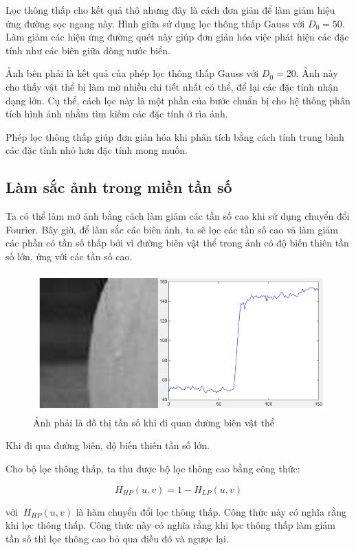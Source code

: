 \documentclass[12pt,a4paper]{report}
\numberwithin{equation}{section}
\theoremstyle{definition} %
\begin{document}
Lọc thông thấp cho kết quả thô nhưng đây là cách đơn giản để làm giảm hiệu ứng đường sọc ngang này. Hình giữa sử dụng lọc thông thấp Gauss với $D_0=50$. Làm giảm các hiệu ứng đường quét này giúp đơn giản hóa việc phát hiện các đặc tính như các biên giữa dòng nước biển.

Ảnh bên phải là kết quả của phép lọc thông thấp Gauss với $D_0=20$. Ảnh này cho thấy vật thể bị làm mờ nhiều chi tiết nhất có thể, để lại các đặc tính nhận dạng lớn. Cụ thể, cách lọc này là một phần của bước chuẩn bị cho hệ thống phân tích hình ảnh nhằm tìm kiếm các đặc tính ở rìa ảnh.

Phép lọc thông thấp giúp đơn giản hóa khi phân tích bằng cách tính trung bình các đặc tính nhỏ hơn đặc tính mong muốn.
\subsection{Làm sắc ảnh trong miền tần số}

Ta có thể làm mở ảnh bằng cách làm giảm các tần số cao khi sử dụng chuyển đổi Fourier. Bây giờ, để làm sắc các biên ảnh, ta sẽ lọc các tần số cao và làm giảm các phần có tần số thấp bởi vì đường biên vật thể trong ảnh có độ biến thiên tần số lớn, ứng với các tần số cao.

\begin{figure}[H]
\centering
\includegraphics[width=0.88\linewidth]{img/lamsacanh1.png}
\caption{Ảnh phải là đồ thị tần số khi đi quan đường biên vật thể}
\label{fig127}
\end{figure}


Khi đi qua đường biên, độ biến thiên tần số lớn.

Cho bộ lọc thông thấp, ta thu được bộ lọc thông cao bằng công thức:

\begin{equation}
  H_{HP}(u,v) = 1 -   H_{LP}(u,v)
\end{equation}

với $\  H_{HP}(u,v)$ là hàm chuyển đổi lọc thông thấp. Công thức này có nghĩa rằng khi lọc thông thấp. Công thức này có nghĩa rằng khi lọc thông thấp làm giảm tần số thì lọc thông cao bỏ qua điều đó và ngược lại.
\end{document}

